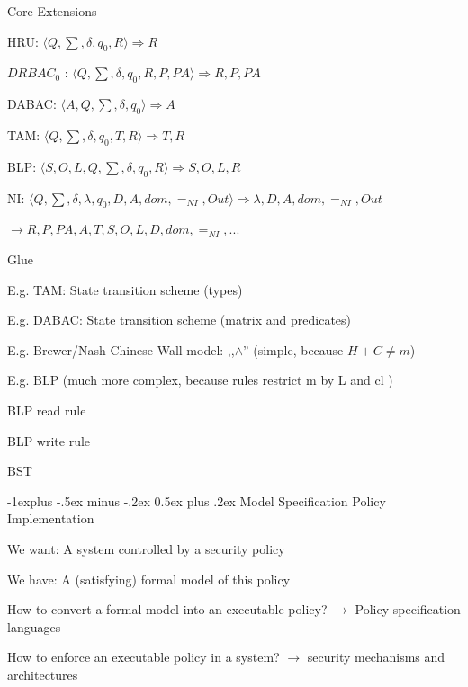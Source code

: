 \documentclass[a4paper]{article}
\makeatletter
\renewcommand{\subsection}{\@startsection{subsection}{2}{0mm}%
                {-1explus -.5ex minus -.2ex}%
                {0.5ex plus .2ex}%
                {\normalfont\normalsize\bfseries}}
\makeatother
\begin{document}
\begin{multicols}{3}
    Core Extensions
    \begin{itemize*}
        \item HRU: $\langle Q, \sum , \delta, q_0 , R \rangle \Rightarrow R$
        \item $DRBAC_0$ : $\langle Q, \sum , \delta, q_0 , R, P, PA \rangle \Rightarrow R,P,PA$
        \item DABAC: $\langle A , Q ,\sum , \delta, q_0 \rangle \Rightarrow A$
        \item TAM: $\langle Q , \sum , \delta, q_0 , T, R \rangle \Rightarrow T,R$
        \item BLP: $\langle S, O, L, Q , \sum , \delta, q_0 , R \rangle \Rightarrow S,O,L,R$
        \item NI: $\langle Q , \sum , \delta, \lambda ,q_0 , D, A, dom, =_{NI} , Out \rangle \Rightarrow \lambda,D,A,dom,=_{NI},Out$
        \item $\rightarrow R, P, PA, A , T , S , O , L , D , dom , =_{NI} , ...$
    \end{itemize*}

    Glue
    \begin{itemize*}
        \item E.g. TAM: State transition scheme (types)
        \item E.g. DABAC: State transition scheme (matrix and predicates)
        \item E.g. Brewer/Nash Chinese Wall model: ,,$\wedge$'' (simple, because $H+C\not= m$)
        \item E.g. BLP (much more complex, because rules restrict m by L and cl )
        \begin{itemize*}
            \item BLP read rule
            \item BLP write rule
            \item BST
        \end{itemize*}
    \end{itemize*}

    \subsection{Model Specification}
    Policy Implementation
    \begin{itemize*}
        \item We want: A system controlled by a security policy
        \item We have: A (satisfying) formal model of this policy
        \item How to convert a formal model into an executable policy? $\rightarrow$ Policy specification languages
        \item How to enforce an executable policy in a system? $\rightarrow$ security mechanisms and architectures
    \end{itemize*}


\end{multicols}
\end{document}
